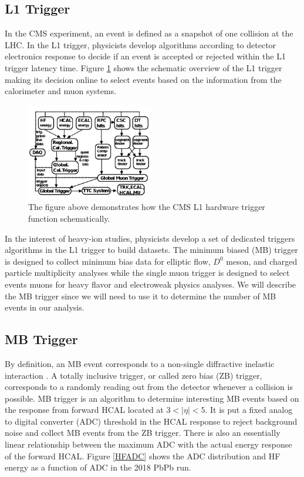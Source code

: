\subsection{L1 Trigger}

In the CMS experiment, an event is defined as a snapshot of one collision at the LHC. In the L1 trigger, physicists develop algorithms according to detector electronics response to decide if an event is accepted or rejected within the L1 trigger latency time. Figure \ref{L1Overview} shows the schematic overview of the L1 trigger making its decision online to select events based on the information from the calorimeter and muon systems.


\begin{figure}[hbtp]
\begin{center}
\includegraphics[width=0.50\textwidth]{Figures/Chapter3/L1Overview.png}
\caption{The figure above demonstrates how the CMS L1 hardware trigger function schematically.}
\label{L1Overview}
\end{center}
\end{figure} 

In the interest of heavy-ion studies, physicists develop a set of dedicated triggers algorithms in the L1 trigger to build datasets. The minimum biased (MB) trigger is designed to collect minimum bias data for elliptic flow, $D^0$ meson, and charged particle multiplicity analyses while the single muon trigger is designed to select events muons for heavy flavor and electroweak physics analyses. We will describe the MB trigger since we will need to use it to determine the number of MB events in our analysis.

\subsection{MB Trigger}

By definition, an MB event corresponds to a non-single diffractive inelastic interaction \cite{MBTrigger}. A totally inclusive trigger, or called zero bias (ZB) trigger, corresponds to a randomly reading out from the detector whenever a collision is possible. MB trigger is an algorithm to determine interesting MB events based on the response from forward HCAL located at $3 < |\eta| < 5$. It is put a fixed analog to digital converter (ADC) threshold in the HCAL response to reject background noise and collect MB events from the ZB trigger. There is also an essentially linear relationship between the maximum ADC with the actual energy response of the forward HCAL. Figure \ref{HFADC} shows the ADC distribution and HF energy as a function of ADC in the 2018 PbPb run.

